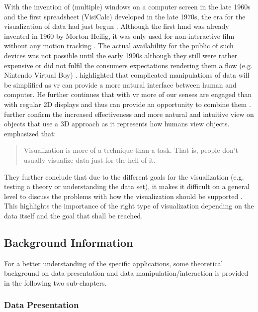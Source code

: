 With the invention of (multiple) windows on a computer screen in the late 1960s and the first spreadsheet (VisiCalc) developed in the late 1970s, the era for the visualization of data had just begun \citep{Myers1998}. Although the first \gls{hmd} was already invented in 1960 by Morton Heilig, it was only used for non-interactive film without any motion tracking \citep{vrs2015}. The actual availability for the public of such devices was not possible until the early 1990s although they still were rather expensive or did not fulfil the consumers expectations rendering them a flow (e.g. Nintendo Virtual Boy) \citep{vrs2015}. \cite{Ribarsky1994} highlighted that complicated manipulations of data will be simplified as \gls{vr} can provide a more natural interface between human and computer. He further continues that with \gls{vr} more of our senses are engaged than with regular 2D displays and thus can provide an opportunity to combine them \citep{Ribarsky1994}. \cite{Jamieson2007} further confirm the increased effectiveness and more natural and intuitive view on objects that use a 3D approach as it represents how humans view objects. \newline
\citet[p.411]{Stone1994} emphasized that: \blockquote{Visualization is more of a technique than a task. That is, people don't usually visualize data just for the hell of it.} They further conclude that due to the different goals for the visualization (e.g. testing a theory or understanding the data set), it makes it difficult on a general level to discuss the problems with how the visualization should be supported \citep{Stone1994}. This highlights the importance of the right type of visualization depending on the data itself and the goal that shall be reached. 



\subsection{Background Information}

For a better understanding of the specific applications, some theoretical background on data presentation and data manipulation/interaction is provided in the following two sub-chapters.


\subsubsection{Data Presentation}

